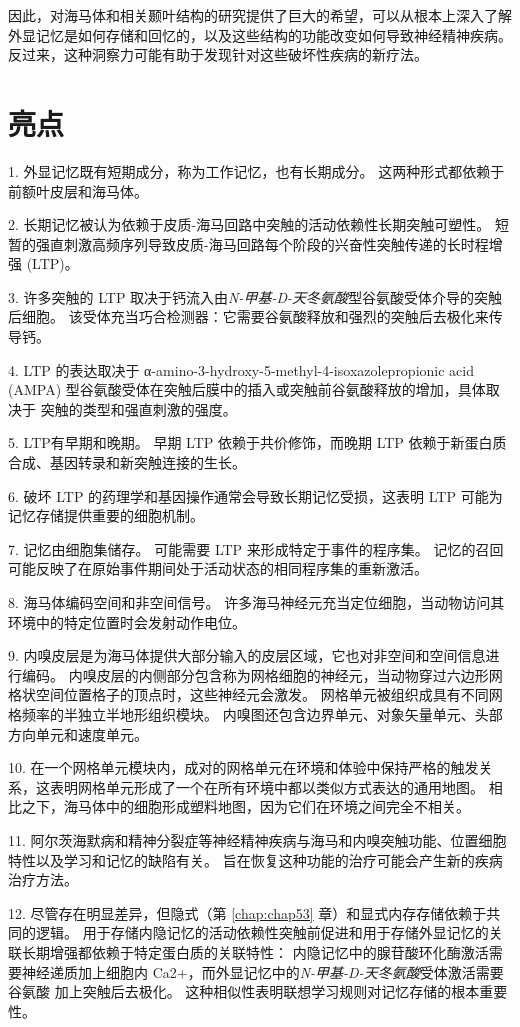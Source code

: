 因此，对海马体和相关颞叶结构的研究提供了巨大的希望，可以从根本上深入了解外显记忆是如何存储和回忆的，以及这些结构的功能改变如何导致神经精神疾病。
反过来，这种洞察力可能有助于发现针对这些破坏性疾病的新疗法。



\section{亮点}

1. 外显记忆既有短期成分，称为工作记忆，也有长期成分。
这两种形式都依赖于前额叶皮层和海马体。 


2. 长期记忆被认为依赖于皮质-海马回路中突触的活动依赖性长期突触可塑性。
短暂的强直刺激高频序列导致皮质-海马回路每个阶段的兴奋性突触传递的长时程增强 (LTP)。


3. 许多突触的 LTP 取决于钙流入由\textit{N-甲基-D-天冬氨酸}型谷氨酸受体介导的突触后细胞。
该受体充当巧合检测器：它需要谷氨酸释放和强烈的突触后去极化来传导钙。 


4. LTP 的表达取决于 α-amino-3-hydroxy-5-methyl-4-isoxazolepropionic acid (AMPA) 型谷氨酸受体在突触后膜中的插入或突触前谷氨酸释放的增加，具体取决于 突触的类型和强直刺激的强度。


5. LTP有早期和晚期。 早期 LTP 依赖于共价修饰，而晚期 LTP 依赖于新蛋白质合成、基因转录和新突触连接的生长。


6. 破坏 LTP 的药理学和基因操作通常会导致长期记忆受损，这表明 LTP 可能为记忆存储提供重要的细胞机制。


7. 记忆由细胞集储存。
可能需要 LTP 来形成特定于事件的程序集。
记忆的召回可能反映了在原始事件期间处于活动状态的相同程序集的重新激活。


8. 海马体编码空间和非空间信号。
许多海马神经元充当定位细胞，当动物访问其环境中的特定位置时会发射动作电位。


9. 内嗅皮层是为海马体提供大部分输入的皮层区域，它也对非空间和空间信息进行编码。
内嗅皮层的内侧部分包含称为网格细胞的神经元，当动物穿过六边形网格状空间位置格子的顶点时，这些神经元会激发。
网格单元被组织成具有不同网格频率的半独立半地形组织模块。
内嗅图还包含边界单元、对象矢量单元、头部方向单元和速度单元。


10. 在一个网格单元模块内，成对的网格单元在环境和体验中保持严格的触发关系，这表明网格单元形成了一个在所有环境中都以类似方式表达的通用地图。
相比之下，海马体中的细胞形成塑料地图，因为它们在环境之间完全不相关。


11. 阿尔茨海默病和精神分裂症等神经精神疾病与海马和内嗅突触功能、位置细胞特性以及学习和记忆的缺陷有关。
旨在恢复这种功能的治疗可能会产生新的疾病治疗方法。 


12. 尽管存在明显差异，但隐式（第 \ref{chap:chap53} 章）和显式内存存储依赖于共同的逻辑。
用于存储内隐记忆的活动依赖性突触前促进和用于存储外显记忆的关联长期增强都依赖于特定蛋白质的关联特性：
内隐记忆中的腺苷酸环化酶激活需要神经递质加上细胞内 Ca2+，而外显记忆中的\textit{N-甲基-D-天冬氨酸}受体激活需要谷氨酸 加上突触后去极化。
这种相似性表明联想学习规则对记忆存储的根本重要性。






